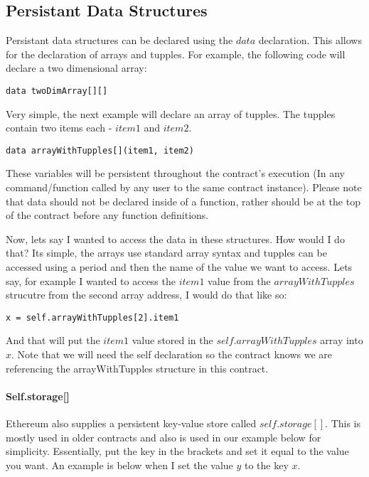 \documentclass[12pt]{article}
\begin{document}
\subsection{Persistant Data Structures}

Persistant data structures can be declared using the $data$ declaration. This allows for the declaration of arrays and tupples. For example, the following code will declare a two dimensional array:

\begin{verbatim}
data twoDimArray[][]
\end{verbatim}

Very simple, the next example will declare an array of tupples. The tupples contain two items each - $item1$ and $item2$.

\begin{verbatim}
data arrayWithTupples[](item1, item2)
\end{verbatim}

These variables will be persistent throughout the contract's execution (In any command/function called by any user to the same contract instance). Please note that data should not be declared inside of a function, rather should be at the top of the contract before any function definitions.

Now, lets say I wanted to access the data in these structures. How would I do that? Its simple, the arrays use standard array syntax and tupples can be accessed using a period and then the name of the value we want to access. Lets say, for example I wanted to access the $item1$ value from the $arrayWithTupples$ strucutre from the second array address, I would do that like so:

\begin{verbatim}
x = self.arrayWithTupples[2].item1
\end{verbatim}

And that will put the $item1$ value stored in the $self.arrayWithTupples$ array into $x$. \cite{Serpent} Note that we will need the self declaration so the contract knows we are referencing the arrayWithTupples structure in this contract.

\paragraph{Self.storage[]}
Ethereum also supplies a persistent key-value store called $self.storage[]$. This is mostly used in older contracts and also is used in our example below for simplicity. Essentially, put the key in the brackets and set it equal to the value you want. An example is below when I set the value $y$ to the key $x$.
\end{document}
